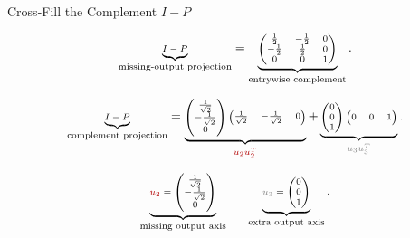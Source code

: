 \documentclass[10pt]{beamer}
\theoremstyle{definition}
\newcommand{\rd}[1]{{\color{red!70!black}#1}}
\newcommand{\gry}[1]{{\color{gray}#1}}
\begin{document}
\begin{frame}[shrink=10]{Cross-Fill the Complement $I-P$}

\[
\scriptsize
\underbrace{I-P}_{\text{missing-output projection}}
=
\underbrace{
\begin{pmatrix}
\frac12&-\frac12&0\\
-\frac12&\frac12&0\\
0&0&1
\end{pmatrix}}_{\text{entrywise complement}}.
\]

\vfill

\[
\scriptsize
\underbrace{I-P}_{\text{complement projection}}
=
\underbrace{
\begin{pmatrix}
\frac1{\sqrt2}\\[0.15em]
-\frac1{\sqrt2}\\[0.15em]
0
\end{pmatrix}
\begin{pmatrix}
\frac1{\sqrt2}&-\frac1{\sqrt2}&0
\end{pmatrix}}_{\rd{u_2u_2^T}}
+
\underbrace{
\begin{pmatrix}
0\\0\\1
\end{pmatrix}
\begin{pmatrix}
0&0&1
\end{pmatrix}}_{\gry{u_3u_3^T}}.
\]

\vfill

\[
\scriptsize
\underbrace{\rd{u_2}=
\begin{pmatrix}
\frac1{\sqrt2}\\[0.15em]
-\frac1{\sqrt2}\\[0.15em]
0
\end{pmatrix}}_{\text{missing output axis}}
\qquad
\underbrace{\gry{u_3}=
\begin{pmatrix}
0\\0\\1
\end{pmatrix}}_{\text{extra output axis}}.
\]

\end{frame}
\end{document}
